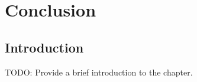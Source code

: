 \chapter{Conclusion}
\label{sec:conclusion}

\section{Introduction}
TODO: Provide a brief introduction to the chapter.